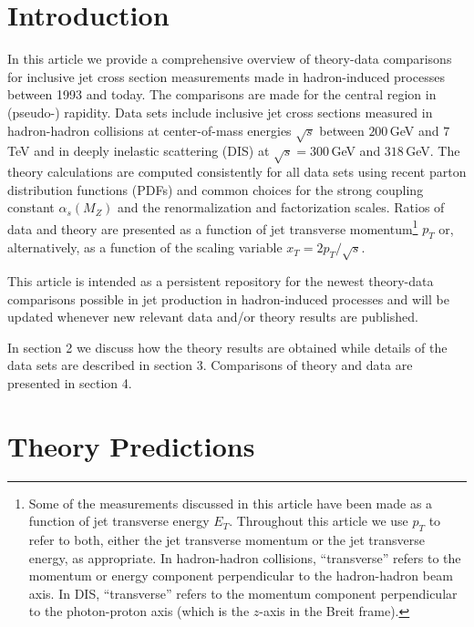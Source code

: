 \documentclass[11pt]{article}
\newcommand{\asmz}{\alpha_s(M_Z)}
\begin{document}
\section{Introduction}

In this article we provide a comprehensive overview
of theory-data comparisons for 
inclusive jet cross section measurements made in hadron-induced processes
between 1993 and today.
The comparisons are made for the central region in (pseudo-) rapidity.
Data sets include inclusive jet cross sections measured in
hadron-hadron collisions at center-of-mass energies $\sqrt{s}$
between $200\,$GeV and $7\,$TeV 
and in deeply inelastic scattering (DIS)
at $\sqrt{s} = 300\,$GeV and $318\,$GeV. 
The theory calculations are computed consistently for all data sets
using recent parton distribution functions (PDFs)
and common choices for the strong coupling constant $\asmz$
and the renormalization and factorization scales.
Ratios of data and theory are presented as a function 
of jet transverse momentum\footnote{Some of the measurements 
discussed in this article have been made 
as a function of jet transverse energy $E_T$.
Throughout this article we use $p_T$ to refer 
to both, either the jet transverse momentum 
or the jet transverse energy, as appropriate.
In hadron-hadron collisions, ``transverse'' refers to the momentum
or energy component perpendicular to the hadron-hadron beam axis.
In DIS, ``transverse'' refers to the momentum component
perpendicular to the photon-proton axis 
(which is the $z$-axis in the Breit frame).}
$p_T$ or, alternatively, as a function of the
scaling variable $x_T = 2p_T/\sqrt{s}$.

This article is intended as a persistent repository for the
newest theory-data comparisons possible in jet production in
hadron-induced
processes and will be updated whenever new relevant data
and/or theory results are published.

In section 2 we discuss how the theory results are obtained
while details of the data sets are described in section 3.
Comparisons of theory and data are presented in section 4.




\section{\label{sec:theory}Theory Predictions}
\end{document}

